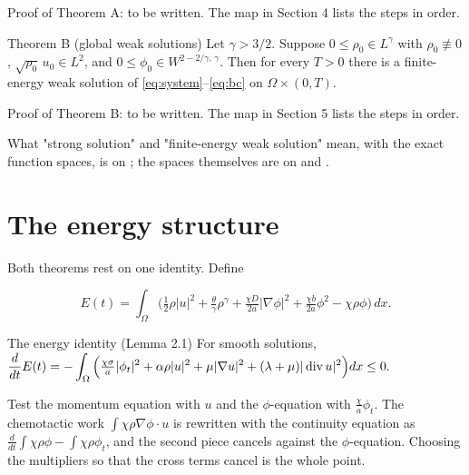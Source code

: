 \begin{proofslot}Proof of Theorem A: to be written. The map in Section 4 lists the steps in order.\end{proofslot}

\begin{thmbox}{Theorem B (global weak solutions)}
%
Let $\gamma > 3/2$. Suppose $0 \le \rho_0 \in L^\gamma$ with $\rho_0 \not\equiv 0$, $\sqrt{\rho_0}\, u_0 \in L^2$, and $0 \le \phi_0 \in W^{2 - 2/\gamma,\, \gamma}$. Then for every $T > 0$ there is a finite-energy weak solution of \eqref{eq:system}--\eqref{eq:bc} on $\Omega \times (0,T)$.
\end{thmbox}

\begin{proofslot}Proof of Theorem B: to be written. The map in Section 5 lists the steps in order.\end{proofslot}

What "strong solution" and "finite-energy weak solution" mean, with the exact function spaces, is on ; the spaces themselves are on  and .

\section{The energy structure}

Both theorems rest on one identity. Define

\begin{equation}\label{eq:energy}
    E(t) = \int_\Omega \Big( \tfrac12 \rho |u|^2 + \tfrac{\theta}{\gamma}\rho^\gamma
      + \tfrac{\chi D}{2a}|\nabla\phi|^2 + \tfrac{\chi b}{2a}\phi^2 - \chi\rho\phi \Big)\, dx .
  \end{equation}

\begin{step}{\routine{}The energy identity (Lemma 2.1)}
For smooth solutions, $\displaystyle \frac{d}{dt}E(t) = -\int_\Omega \Big( \tfrac{\chi\sigma}{a}|\phi_t|^2 + \alpha\rho|u|^2 + \mu|\nabla u|^2 + (\lambda+\mu)|\operatorname{div} u|^2 \Big)dx \le 0.$

Test the momentum equation with $u$ and the $\phi$-equation with $\frac{\chi}{a}\phi_t$. The chemotactic work $\int \chi\rho\nabla\phi\cdot u$ is rewritten with the continuity equation as $\frac{d}{dt}\int\chi\rho\phi - \int\chi\rho\phi_t$, and the second piece cancels against the $\phi$-equation. Choosing the multipliers so that the cross terms cancel is the whole point.

\end{step}

